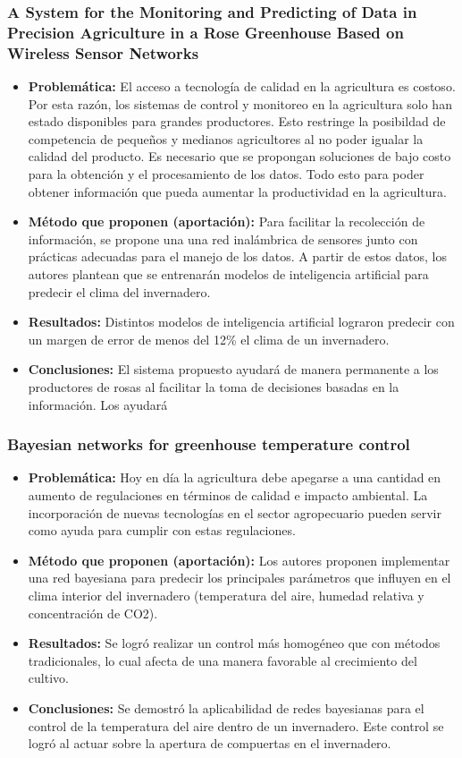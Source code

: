 \documentclass[final,12pt]{article}
\begin{document}
\subsubsection{A System for the Monitoring and Predicting of Data in Precision Agriculture in a Rose Greenhouse Based on Wireless Sensor Networks}
\begin{itemize}
    \item \textbf{Problemática: }
    El acceso a tecnología de calidad en la agricultura es costoso. Por esta razón, los sistemas de control y monitoreo en la agricultura 
	solo han estado disponibles para grandes productores. Esto restringe la posibildad de competencia de pequeños y medianos agricultores 
	al no poder igualar la calidad del producto. Es necesario que se propongan soluciones de bajo costo para la obtención y el procesamiento 
	de los datos. Todo esto para poder obtener información que pueda aumentar la productividad en la agricultura.
    \item \textbf{Método que proponen (aportación): } Para facilitar la recolección de información, se propone una una red inalámbrica de 
	sensores junto con prácticas adecuadas para el manejo de los datos. A partir de estos datos, los autores plantean que se entrenarán 
	modelos de inteligencia artificial para predecir el clima del invernadero. 
    \item \textbf{Resultados:}
    Distintos modelos de inteligencia artificial lograron predecir con un margen de error de menos del 12\% el clima de un invernadero.
    \item \textbf{Conclusiones:} El sistema propuesto ayudará de manera permanente a los productores de rosas al facilitar la toma de decisiones 
	basadas en la información. Los ayudará 
\end{itemize}

\subsubsection{Bayesian networks for greenhouse temperature control}
\begin{itemize}
    \item \textbf{Problemática: }
    Hoy en día la agricultura debe apegarse a una cantidad en aumento de regulaciones en términos de calidad e impacto ambiental.
	La incorporación de nuevas tecnologías en el sector agropecuario pueden servir como ayuda para cumplir con estas regulaciones.
    \item \textbf{Método que proponen (aportación): }
    Los autores proponen implementar una red bayesiana para predecir los principales parámetros que influyen en el clima interior del invernadero 
	(temperatura del aire, humedad relativa y concentración de CO2).
    \item \textbf{Resultados: }
    Se logró realizar un control más homogéneo que con métodos tradicionales, lo cual afecta de una manera favorable al crecimiento del cultivo.
    \item \textbf{Conclusiones:}
    Se demostró la aplicabilidad de redes bayesianas para el control de la temperatura del aire dentro de un invernadero. Este control se logró
	al actuar sobre la apertura de compuertas en el invernadero.
\end{itemize}
\end{document}
